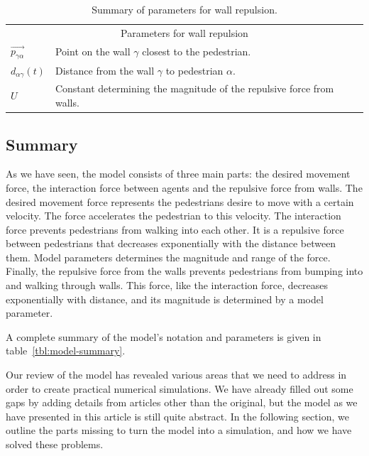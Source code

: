 \begin{table}[h]
    \centering
    \begin{tabular}{l l}
        \toprule
        \multicolumn{2}{c}{\textsf{Parameters for wall repulsion}}\\
        $\overrightarrow{p_{\gamma \alpha}}$ & Point on the wall $\gamma$ closest to
        the pedestrian.\\
        $d_{\alpha \gamma}(t)$ & Distance from the wall $\gamma$ to pedestrian
        $\alpha$. \\
        $U$ & Constant determining the magnitude of the repulsive force from
        walls. \\
        \bottomrule
    \end{tabular}
    \caption{Summary of parameters for wall repulsion.}
    \label{tbl:wall-repulsion}
\end{table}

\subsection{Summary}
As we have seen, the model consists of three main parts: the desired movement
force, the interaction force between agents and the repulsive force from
walls. The desired movement force represents the pedestrians desire to move with
a certain velocity. The force accelerates the
pedestrian to this velocity. The interaction force
prevents pedestrians from walking into each other. It is a repulsive force
between pedestrians that decreases exponentially with the distance between them. 
Model parameters determines the magnitude and range of the force.
Finally, the repulsive force from the walls prevents pedestrians from bumping
into and walking through walls. This force, like the interaction force,
decreases exponentially with distance, and its magnitude is determined by a
model parameter.

A complete summary of the model's notation and parameters is given in
table~\ref{tbl:model-summary}.

Our review of the model has revealed various areas that we need to address in
order to create practical numerical simulations. We have already filled out
some gaps by adding details from articles other than the original, but the
model as we have presented in this article is still quite abstract. In the
following section, we outline the parts missing to turn the model into a
simulation, and how we have solved these problems.


